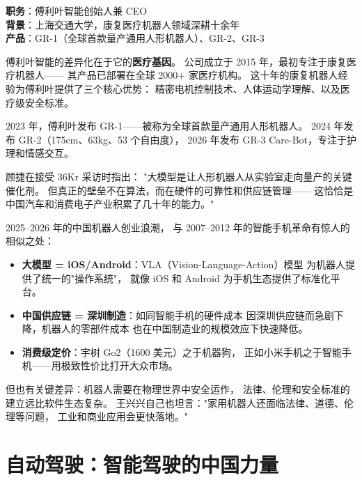 \begin{keybox}[人物档案：顾捷]
\textbf{职务}：傅利叶智能创始人兼 CEO \\
\textbf{背景}：上海交通大学，康复医疗机器人领域深耕十余年 \\
\textbf{产品}：GR-1（全球首款量产通用人形机器人）、GR-2、GR-3
\end{keybox}

傅利叶智能的差异化在于它的\textbf{医疗基因}。
公司成立于 2015 年，最初专注于康复医疗机器人——
其产品已部署在全球 2000+ 家医疗机构。
这十年的康复机器人经验为傅利叶提供了三个核心优势：
精密电机控制技术、人体运动学理解、以及医疗级安全标准。

2023 年，傅利叶发布 GR-1——被称为全球首款量产通用人形机器人。
2024 年发布 GR-2（175cm、63kg、53 个自由度），
2026 年发布 GR-3 Care-Bot，专注于护理和情感交互。

顾捷在接受 36Kr 采访时指出：
"大模型是让人形机器人从实验室走向量产的关键催化剂。
但真正的壁垒不在算法，而在硬件的可靠性和供应链管理——
这恰恰是中国汽车和消费电子产业积累了几十年的能力。"

\begin{corebox}
2025--2026 年的中国机器人创业浪潮，
与 2007--2012 年的智能手机革命有惊人的相似之处：
\begin{itemize}[noitemsep]
  \item \textbf{大模型 = iOS/Android}：VLA（Vision-Language-Action）模型
        为机器人提供了统一的"操作系统"，
        就像 iOS 和 Android 为手机生态提供了标准化平台。
  \item \textbf{中国供应链 = 深圳制造}：如同智能手机的硬件成本
        因深圳供应链而急剧下降，机器人的零部件成本
        也在中国制造业的规模效应下快速降低。
  \item \textbf{消费级定价}：宇树 Go2（1600 美元）之于机器狗，
        正如小米手机之于智能手机——用极致性价比打开大众市场。
\end{itemize}
但也有关键差异：机器人需要在物理世界中安全运作，
法律、伦理和安全标准的建立远比软件生态复杂。
王兴兴自己也坦言："家用机器人还面临法律、道德、伦理等问题，
工业和商业应用会更快落地。"
\end{corebox}



\section{自动驾驶：智能驾驶的中国力量}
\label{sec:autonomous-driving}

